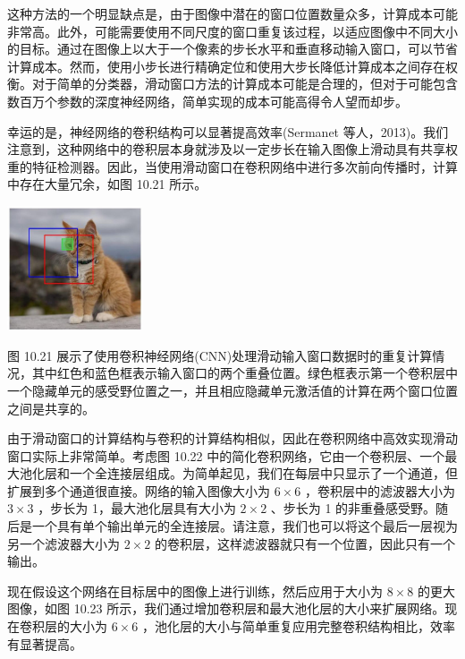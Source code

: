 \documentclass[10pt]{article}
\begin{document}
这种方法的一个明显缺点是，由于图像中潜在的窗口位置数量众多，计算成本可能非常高。此外，可能需要使用不同尺度的窗口重复该过程，以适应图像中不同大小的目标。通过在图像上以大于一个像素的步长水平和垂直移动输入窗口，可以节省计算成本。然而，使用小步长进行精确定位和使用大步长降低计算成本之间存在权衡。对于简单的分类器，滑动窗口方法的计算成本可能是合理的，但对于可能包含数百万个参数的深度神经网络，简单实现的成本可能高得令人望而却步。

幸运的是，神经网络的卷积结构可以显著提高效率(Sermanet 等人，2013)。我们注意到，这种网络中的卷积层本身就涉及以一定步长在输入图像上滑动具有共享权重的特征检测器。因此，当使用滑动窗口在卷积网络中进行多次前向传播时，计算中存在大量冗余，如图 10.21 所示。

\begin{center}
\includegraphics[max width=0.3\textwidth]{images/0194e279-9b28-703a-88f4-c3ac21e2010d_331_999_349_479_441_0.jpg}
\end{center}
\hspace*{3em} 

图 10.21 展示了使用卷积神经网络(CNN)处理滑动输入窗口数据时的重复计算情况，其中红色和蓝色框表示输入窗口的两个重叠位置。绿色框表示第一个卷积层中一个隐藏单元的感受野位置之一，并且相应隐藏单元激活值的计算在两个窗口位置之间是共享的。

由于滑动窗口的计算结构与卷积的计算结构相似，因此在卷积网络中高效实现滑动窗口实际上非常简单。考虑图 10.22 中的简化卷积网络，它由一个卷积层、一个最大池化层和一个全连接层组成。为简单起见，我们在每层中只显示了一个通道，但扩展到多个通道很直接。网络的输入图像大小为 \(6 \times  6\) ，卷积层中的滤波器大小为 \(3 \times  3\) ，步长为 1，最大池化层具有大小为 \(2 \times  2\) 、步长为 1 的非重叠感受野。随后是一个具有单个输出单元的全连接层。请注意，我们也可以将这个最后一层视为另一个滤波器大小为 \(2 \times  2\) 的卷积层，这样滤波器就只有一个位置，因此只有一个输出。

现在假设这个网络在目标居中的图像上进行训练，然后应用于大小为 \(8 \times  8\) 的更大图像，如图 10.23 所示，我们通过增加卷积层和最大池化层的大小来扩展网络。现在卷积层的大小为 \(6 \times  6\) ，池化层的大小与简单重复应用完整卷积结构相比，效率有显著提高。
\end{document}

